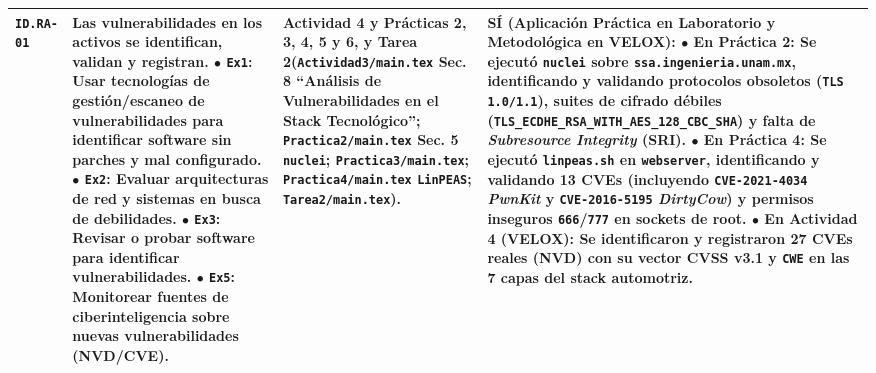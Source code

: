 \documentclass[letterpaper,11pt]{article}
\begin{document}
\begin{longtable}{|C{1.5cm}|L{5.3cm}|L{4.3cm}|L{5.8cm}|}
\texttt{ID.RA-01} &
\textbf{Las vulnerabilidades en los activos se identifican, validan y registran.}\newline
$\bullet$ \texttt{Ex1}: \textbf{Usar tecnologías de gestión/escaneo de vulnerabilidades para identificar software sin parches y mal configurado}.\newline
$\bullet$ \texttt{Ex2}: Evaluar arquitecturas de red y sistemas en busca de debilidades.\newline
$\bullet$ \texttt{Ex3}: Revisar o probar software para identificar vulnerabilidades.\newline
$\bullet$ \texttt{Ex5}: Monitorear fuentes de ciberinteligencia sobre nuevas vulnerabilidades (NVD/CVE). &
\textbf{Actividad 4 y Prácticas 2, 3, 4, 5 y 6, y Tarea 2}\newline (\texttt{Actividad3/main.tex} Sec. 8 ``Análisis de Vulnerabilidades en el Stack Tecnológico''; \texttt{Practica2/main.tex} Sec. 5 \texttt{nuclei}; \texttt{Practica3/main.tex}; \texttt{Practica4/main.tex} \texttt{LinPEAS}; \texttt{Tarea2/main.tex}). &
\textbf{SÍ (Aplicación Práctica en Laboratorio y Metodológica en VELOX):}\newline
$\bullet$ \textbf{En Práctica 2:} Se ejecutó \texttt{nuclei} sobre \texttt{ssa.ingenieria.unam.mx}, identificando y validando protocolos obsoletos (\texttt{TLS 1.0/1.1}), suites de cifrado débiles (\texttt{TLS\_ECDHE\_RSA\_WITH\_AES\_128\_CBC\_SHA}) y falta de \textit{Subresource Integrity} (SRI).\newline
$\bullet$ \textbf{En Práctica 4:} Se ejecutó \texttt{linpeas.sh} en \texttt{webserver}, identificando y validando \textbf{13 CVEs} (incluyendo \texttt{CVE-2021-4034} \textit{PwnKit} y \texttt{CVE-2016-5195} \textit{DirtyCow}) y permisos inseguros \texttt{666}/\texttt{777} en sockets de root.\newline
$\bullet$ \textbf{En Actividad 4 (VELOX):} Se identificaron y registraron \textbf{27 CVEs reales} (NVD) con su vector CVSS v3.1 y \texttt{CWE} en las 7 capas del stack automotriz. \\
\hline


\end{longtable}
\end{document}
